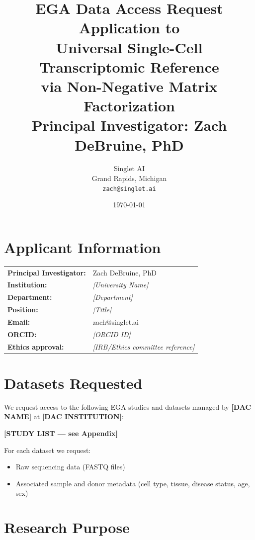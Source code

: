 \documentclass[11pt,a4paper]{article}
\title{%
    \vspace{-1.5cm}
    \textbf{EGA Data Access Request}\\[0.3em]
    \large Application to \DACName\\[0.3em]
    \normalsize Universal Single-Cell Transcriptomic Reference\\
    via Non-Negative Matrix Factorization\\[0.3em]
    \normalsize Principal Investigator: Zach DeBruine, PhD
}
\author{
    Singlet AI\\
    Grand Rapids, Michigan\\
    \texttt{zach@singlet.ai}
}
\date{\today}
\newcommand{\DACName}{{\color{red}\textbf{[DAC NAME]}}}
\newcommand{\DACInstitution}{{\color{red}\textbf{[DAC INSTITUTION]}}}
\newcommand{\StudyList}{{\color{red}\textbf{[STUDY LIST --- see Appendix]}}}
\begin{document}
\maketitle
\thispagestyle{fancy}

\section{Applicant Information}

\begin{tabular}{@{} l p{9cm} @{}}
\textbf{Principal Investigator:} & Zach DeBruine, PhD \\
\textbf{Institution:} & \textit{[University Name]} \\
\textbf{Department:} & \textit{[Department]} \\
\textbf{Position:} & \textit{[Title]} \\
\textbf{Email:} & zach@singlet.ai \\
\textbf{ORCID:} & \textit{[ORCID ID]} \\
\textbf{Ethics approval:} & \textit{[IRB/Ethics committee reference]} \\
\end{tabular}

\section{Datasets Requested}

We request access to the following EGA studies and datasets managed by
\DACName{} at \DACInstitution:

\StudyList{}

\noindent For each dataset we request:
\begin{itemize}[nosep]
    \item Raw sequencing data (FASTQ files)
    \item Associated sample and donor metadata (cell type, tissue,
          disease status, age, sex)
\end{itemize}

\section{Research Purpose}
\end{document}
